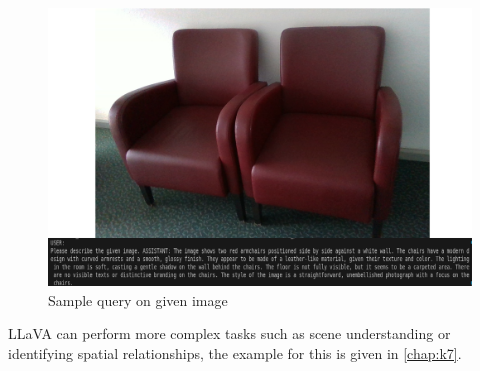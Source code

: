 \begin{figure}[ht!]
    \centering
    \includegraphics[width=\textwidth]{content/images/theory/LLaVA.png}
    \caption{Sample query on given image \cite{cheng2024yolow}}
    \label{fig:llava}
\end{figure}
 LLaVA can perform more complex tasks such as scene understanding or identifying spatial relationships, the example for this is given in \cref{chap:k7}.


